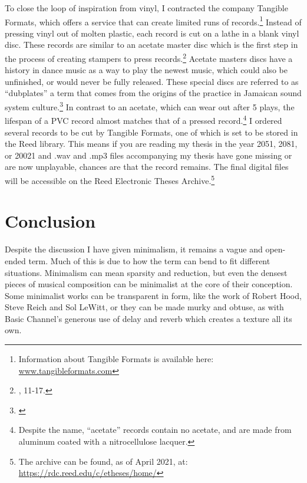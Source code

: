 \documentclass[12pt,twoside]{reedthesis}
\begin{document}
To close the loop of inspiration from vinyl, I contracted the company Tangible Formats, which offers a service that can create limited runs of records.\footnote{Information about Tangible Formats is available here: \url{www.tangibleformats.com}} Instead of pressing vinyl out of molten plastic, each record is cut on a lathe in a blank vinyl disc. These records are similar to an acetate master disc which is the first step in the process of creating stampers to press records.\footnote{\cite{hooseTurningTablesEngineering2018}, 11-17.} Acetate masters discs have a history in dance music as a way to play the newest music, which could also be unfinished, or would never be fully released. These special discs are referred to as ``dubplates'' a term that comes from the origins of the practice in Jamaican sound system culture.\footnote{\cite{bennettDubplateCultureAnalogue}} In contrast to an acetate, which can wear out after 5 plays, the lifespan of a PVC record almost matches that of a pressed record.\footnote{Despite the name, ``acetate'' records contain no acetate, and are made from aluminum coated with a nitrocellulose lacquer.} I ordered several records to be cut by Tangible Formats, one of which is set to be stored in the Reed library. This means if you are reading my thesis in the year 2051, 2081, or 20021 and .wav and .mp3 files accompanying my thesis have gone missing or are now unplayable, chances are that the record remains. The final digital files will be accessible on the Reed Electronic Theses Archive.\footnote{The archive can be found, as of April 2021, at: \url{https://rdc.reed.edu/c/etheses/home/}}

\section{Conclusion}

Despite the discussion I have given minimalism, it remains a vague and open-ended term. Much of this is due to how the term can bend to fit different situations. Minimalism can mean sparsity and reduction, but even the densest pieces of musical composition can be minimalist at the core of their conception. Some minimalist works can be transparent in form, like the work of Robert Hood, Steve Reich and Sol LeWitt, or they can be made murky and obtuse, as with Basic Channel's generous use of delay and reverb which creates a texture all its own.
\end{document}
